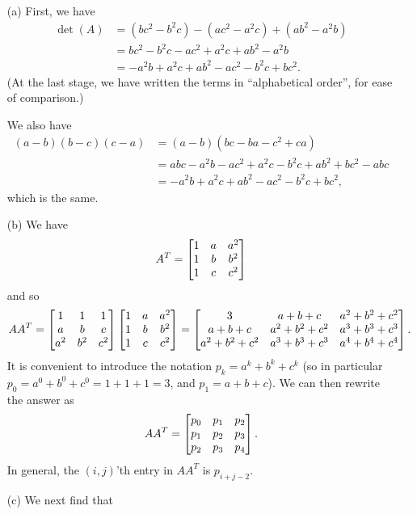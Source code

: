 \documentclass[a4paper]{book}
\theoremstyle{definition}
\renewenvironment{solution}{\SolutionInline}{\endSolutionInline}
\begin{document}
\begin{solution}
 \begin{itemize}
  \item[(a)] First, we have
   \begin{align*}
    \det(A) &= (bc^2 - b^2c) - (ac^2 - a^2c) + (ab^2 - a^2b) \\
            &= bc^2 - b^2c - ac^2 + a^2c + ab^2 - a^2b \\
            &= -a^2b + a^2c + ab^2 - ac^2 - b^2c + bc^2.
   \end{align*}
   (At the last stage, we have written the terms in ``alphabetical
   order'', for ease of comparison.)

   We also have
   \begin{align*}
    (a-b)(b-c)(c-a) &= (a-b)(bc-ba-c^2+ca) \\
                    &= abc-a^2b-ac^2+a^2c-b^2c+ab^2+bc^2-abc \\
                    &= -a^2b + a^2c + ab^2 - ac^2 - b^2c + bc^2,
   \end{align*}
   which is the same.
  \item[(b)] We have
   \[ A^T = \begin{bmatrix}
              1 & a & a^2 \\
              1 & b & b^2 \\
              1 & c & c^2
            \end{bmatrix}
   \]
   and so
   \[ AA^T =
          \begin{bmatrix}
            1   & 1   & 1   \\
            a   & b   & c   \\
            a^2 & b^2 & c^2
          \end{bmatrix}
          \begin{bmatrix}
            1 & a & a^2 \\
            1 & b & b^2 \\
            1 & c & c^2
          \end{bmatrix} =
          \begin{bmatrix}
            3           & a+b+c       & a^2+b^2+c^2 \\
            a+b+c       & a^2+b^2+c^2 & a^3+b^3+c^3 \\
            a^2+b^2+c^2 & a^3+b^3+c^3 & a^4+b^4+c^4
          \end{bmatrix}.
   \]
   It is convenient to introduce the notation
   $p_k=a^k+b^k+c^k$ (so in particular $p_0=a^0+b^0+c^0=1+1+1=3$, and
   $p_1=a+b+c$).  We can then rewrite the answer as
   \[  AA^T =
          \begin{bmatrix}
            p_0 & p_1 & p_2 \\
            p_1 & p_2 & p_3 \\
            p_2 & p_3 & p_4
          \end{bmatrix}.
   \]
   In general, the $(i,j)$'th entry in $AA^T$ is $p_{i+j-2}$.
  \item[(c)]
   We next find that
   \begin{align*}

\end{align*}
\end{itemize}
\end{solution}
\end{document}
